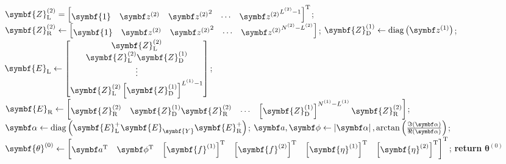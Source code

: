 \begin{algorithm}
    \begin{algorithmic}
        \State $
        \symbf{Z}^{(2)}_{\text{L}} =
        \begin{bmatrix}
            \symbf{1} &
            \bdztwo &
            {\bdztwo}^2 &
            \cdots &
            {\bdztwo}^{\Ltwo-1}
        \end{bmatrix}\T
        $;
        \State $
            \symbf{Z}^{(2)}_{\text{R}} \gets
            \begin{bmatrix}
                \symbf{1} & \bdztwo & {\bdztwo}^2 & \cdots & {\bdztwo}^{\Ntwo - \Ltwo}
            \end{bmatrix}
        $;
        \State $\symbf{Z}^{(1)}_{\text{D}} \gets \diag\left(\bdzone\right)$;
       \State $
            \symbf{E}_{\text{L}} \gets
            \begin{bmatrix}
                \symbf{Z}^{(2)}_{\text{L}} \\
                \symbf{Z}^{(2)}_{\text{L}} \symbf{Z}^{(1)}_{\text{D}} \\
                \vdots\\
                \symbf{Z}^{(2)}_{\text{L}} \left[\symbf{Z}^{(1)}_{\text{D}}\right]^{\Lone - 1}
            \end{bmatrix}
        $;
        \State $
            \symbf{E}_{\text{R}} \gets
            \begin{bmatrix}
                \symbf{Z}^{(2)}_{\text{R}} &
                \symbf{Z}^{(1)}_{\text{D}} \symbf{Z}^{(2)}_{\text{R}} &
                \cdots &
                \left[\symbf{Z}^{(1)}_{\text{D}}\right]^{\None - \Lone} \symbf{Z}^{(2)}_{\text{R}}
            \end{bmatrix}
        $;
        \State $
           \bdalpha \gets \diag
           \left(
               \symbf{E}_{\text{L}}^+
               \symbf{E}_{\symbf{Y}}^{\vphantom{+}}
               \symbf{E}_{\text{R}}^+
           \right)
           $;
        \State $
            \bda, \bdphi \gets
            \left\lvert \bdalpha \right\rvert,
            \arctan \left( \frac{\Im\left(\bdalpha\right)}{\Re\left(\bdalpha\right)} \right)
        $;
        \State $\symbf{\theta}^{(0)} \gets
        \begin{bmatrix}
            \bda\T &
            \bdphi\T &
            \left[\symbf{f}^{(1)}\right]\T &
            \left[\symbf{f}^{(2)}\right]\T &
            \left[\symbf{\eta}^{(1)}\right]\T &
            \left[\symbf{\eta}^{(2)}\right]\T
        \end{bmatrix}
        ^{\mathrm{T}}$;
        \State \textbf{return} $\symbf{\theta}^{(0)}$
    \EndProcedure
    \end{algorithmic}
\end{algorithm}
\vfill\null


